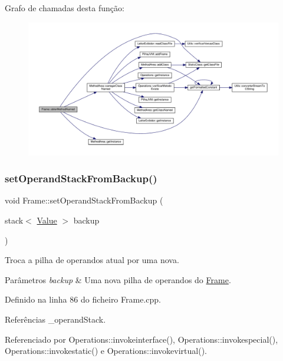 Grafo de chamadas desta função\+:
\nopagebreak
\begin{figure}[H]
\begin{center}
\leavevmode
\includegraphics[width=350pt]{classFrame_a9920bdecf44e07796b7feea5bc4f1a6c_cgraph}
\end{center}
\end{figure}
\mbox{\label{classFrame_afda87a144c907a9220ea2209ad3cd429}} 
\subsubsection{\texorpdfstring{set\+Operand\+Stack\+From\+Backup()}{setOperandStackFromBackup()}}
{\footnotesize\ttfamily void Frame\+::set\+Operand\+Stack\+From\+Backup (\begin{DoxyParamCaption}\item[{stack$<$ \hyperlink{structValue}{Value} $>$}]{backup }\end{DoxyParamCaption})}



Troca a pilha de operandos atual por uma nova. 


\begin{DoxyParams}{Parâmetros}
{\em backup} & Uma nova pilha de operandos do \hyperlink{classFrame}{Frame}. \\
\hline
\end{DoxyParams}


Definido na linha 86 do ficheiro Frame.\+cpp.



Referências \+\_\+operand\+Stack.



Referenciado por Operations\+::invokeinterface(), Operations\+::invokespecial(), Operations\+::invokestatic() e Operations\+::invokevirtual().

